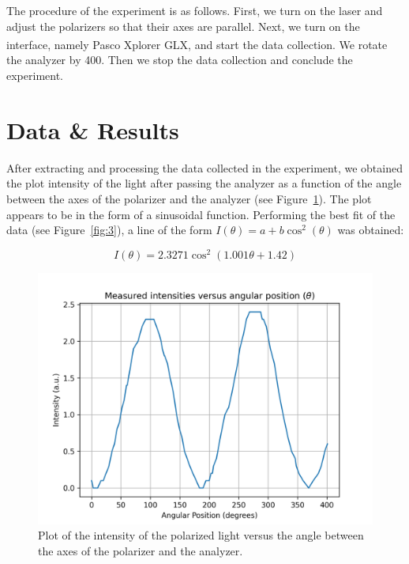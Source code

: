 \documentclass[10pt]{article}
\begin{document}
The procedure of the experiment is as follows. First, we turn on the laser and adjust the polarizers so that their axes are parallel. Next, we turn on the interface, namely Pasco\textsuperscript{\textregistered} Xplorer GLX, and start the data collection. We rotate the analyzer by 400\degree. Then we stop the data collection and conclude the experiment.

\section{Data \& Results}

After extracting and processing the data collected in the experiment, we obtained the plot intensity of the light after passing the analyzer as a function of the angle between the axes of the polarizer and the analyzer (see Figure~\ref{fig:2}).
The plot appears to be in the form of a sinusoidal function. Performing the best fit of the data (see Figure~\ref{fig:3}), a line of the form $I(\theta) = a + b\cos^2(\theta)$ was obtained:

\begin{equation}
  I(\theta) = 2.3271\cos^2(1.001\theta+1.42)
  \label{eq:2}
\end{equation}

\begin{figure}[h!]
  \centering
  \includegraphics[scale=0.6]{plots/plot1.png}
  \caption{Plot of the intensity of the polarized light versus the angle between the axes of the polarizer and the analyzer.}
  \label{fig:2}
\end{figure}
\end{document}
